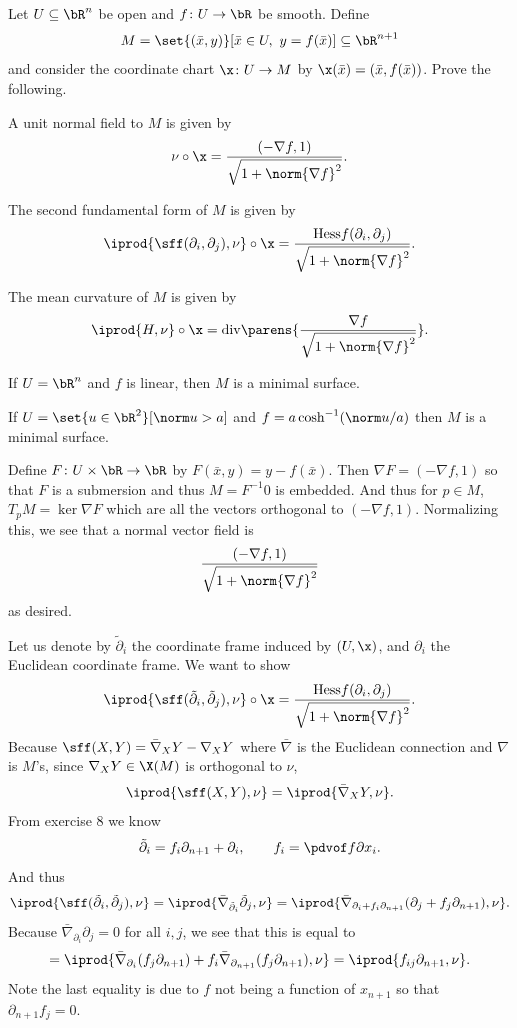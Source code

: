 \def\hess{{\rm Hess}}
\def\div{{\rm div}}

\bprob

    Let $U\subseteq\bR^n$ be open and $f\colon U\to\bR$ be smooth.
    Define
    $$ M = \set{(\bar x,y)}[\bar x\in U,\ y=f(\bar x)] \subseteq \bR^{n+1} $$
    and consider the coordinate chart $\x\colon U\to M$ by $\x(\bar x)=(\bar x,f(\bar x))$.
    Prove the following.
    \benum
        \item A unit normal field to $M$ is given by
        $$ \nu\circ\x = \frac{(-\nabla f,1)}{\sqrt{1+\norm{\nabla f}^2}} . $$
        \item The second fundamental form of $M$ is given by
        $$ \iprod{\sff(\partial_i,\partial_j),\nu}\circ\x = \frac{\hess f(\partial_i,\partial_j)}{\sqrt{1+\norm{\nabla f}^2}} . $$
        \item The mean curvature of $M$ is given by
        $$ \iprod{H,\nu}\circ\x = \div\parens{\frac{\nabla f}{\sqrt{1+\norm{\nabla f}^2}}} . $$
        \item If $U=\bR^n$ and $f$ is linear, then $M$ is a minimal surface.
        \item If $U=\set{u\in\bR^2}[\norm u>a]$ and $f=a\cosh^{-1}(\norm u/a)$ then $M$ is a minimal surface.
    \eenum

\eprob

\def\tpart{\tilde\partial}
\benum
    \item Define $F\colon U\times\bR\to\bR$ by $F(\bar x,y)=y-f(\bar x)$.
    Then $\nabla F=(-\nabla f,1)$ so that $F$ is a submersion and thus $M=F^{-1}0$ is embedded.
    And thus for $p\in M$, $T_pM=\ker\nabla F$ which are all the vectors orthogonal to $(-\nabla f,1)$.
    Normalizing this, we see that a normal vector field is
    $$ \frac{(-\nabla f,1)}{\sqrt{1+\norm{\nabla f}^2}} $$
    as desired.

    \item Let us denote by $\tilde\partial_i$ the coordinate frame induced by $(U,\x)$, and $\partial_i$ the Euclidean coordinate frame.
    We want to show
    $$ \iprod{\sff(\tilde\partial_i,\tilde\partial_j),\nu}\circ\x = \frac{\hess f(\partial_i,\partial_j)}{\sqrt{1+\norm{\nabla f}^2}} . $$
    Because $\sff(X,Y)=\bar\nabla_XY-\nabla_XY$ where $\bar\nabla$ is the Euclidean connection and $\nabla$ is $M$'s, since $\nabla_XY\in\X(M)$ is orthogonal to $\nu$,
    $$ \iprod{\sff(X,Y),\nu} = \iprod{\bar\nabla_XY,\nu} . $$
    From exercise 8 we know
    $$ \tilde\partial_i = f_i\partial_{n+1} + \partial_i,\qquad f_i=\pdvof f{\partial x_i} . $$
    And thus
    $$ \iprod{\sff(\tpart_i,\tpart_j),\nu} = \iprod{\bar\nabla_{\tpart_i}\tpart_j,\nu} = \iprod{\bar\nabla_{\partial_i+f_i\partial_{n+1}}(\partial_j+f_j\partial_{n+1}),\nu} . $$
    Because $\bar\nabla_{\partial_i}\partial_j=0$ for all $i,j$, we see that this is equal to
    $$ = \iprod{\bar\nabla_{\partial_i}(f_j\partial_{n+1})+f_i\bar\nabla_{\partial_{n+1}}(f_j\partial_{n+1}),\nu} = \iprod{f_{ij}\partial_{n+1},\nu} . $$
    Note the last equality is due to $f$ not being a function of $x_{n+1}$ so that $\partial_{n+1}f_j=0$.

